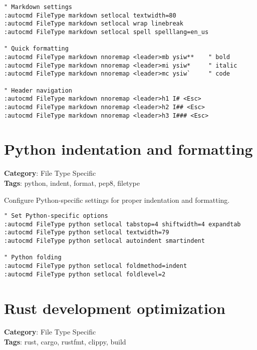 {{{{{{\begin{Exa*}{}
\begin{Verbatim}[fontsize=\footnotesize, breaklines, breakanywhere]
" Markdown settings
:autocmd FileType markdown setlocal textwidth=80
:autocmd FileType markdown setlocal wrap linebreak
:autocmd FileType markdown setlocal spell spelllang=en_us

" Quick formatting
:autocmd FileType markdown nnoremap <leader>mb ysiw**    " bold
:autocmd FileType markdown nnoremap <leader>mi ysiw*     " italic
:autocmd FileType markdown nnoremap <leader>mc ysiw`     " code

" Header navigation
:autocmd FileType markdown nnoremap <leader>h1 I# <Esc>
:autocmd FileType markdown nnoremap <leader>h2 I## <Esc>
:autocmd FileType markdown nnoremap <leader>h3 I### <Esc>
\end{Verbatim}
\end{Exa*}

\section{Python indentation and formatting}

\textbf{Category}: File Type Specific\\ \textbf{Tags}: python, indent, format, pep8, filetype
\vspace{0.5cm}

Configure Python-specific settings for proper indentation and formatting.

\begin{Exa*}{}
\begin{Verbatim}[fontsize=\footnotesize, breaklines, breakanywhere]
" Set Python-specific options
:autocmd FileType python setlocal tabstop=4 shiftwidth=4 expandtab
:autocmd FileType python setlocal textwidth=79
:autocmd FileType python setlocal autoindent smartindent

" Python folding
:autocmd FileType python setlocal foldmethod=indent
:autocmd FileType python setlocal foldlevel=2
\end{Verbatim}
\end{Exa*}

\section{Rust development optimization}

\textbf{Category}: File Type Specific\\ \textbf{Tags}: rust, cargo, rustfmt, clippy, build
\vspace{0.5cm}

}}}}}}
